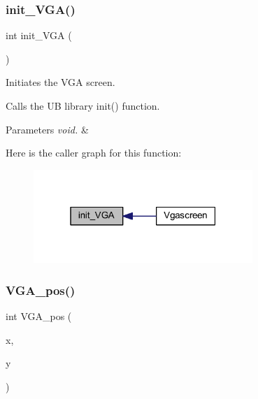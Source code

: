 \subsubsection{\texorpdfstring{init\+\_\+\+V\+G\+A()}{init\_VGA()}}
{\footnotesize\ttfamily int init\+\_\+\+V\+GA (\begin{DoxyParamCaption}\item[{void}]{ }\end{DoxyParamCaption})\hspace{0.3cm}{\ttfamily [private]}}



Initiates the V\+GA screen. 

Calls the UB library init() function.


\begin{DoxyParams}{Parameters}
{\em void.} & \\
\hline
\end{DoxyParams}
Here is the caller graph for this function\+:
\nopagebreak
\begin{figure}[H]
\begin{center}
\leavevmode
\includegraphics[width=235pt]{class_vgascreen_a8240f97328e1e32fdec08a113c927e4f_icgraph}
\end{center}
\end{figure}
\mbox{\label{class_vgascreen_a4e52b131d405cf11ad6aed9b993ed138}} 
\subsubsection{\texorpdfstring{V\+G\+A\+\_\+pos()}{VGA\_pos()}}
{\footnotesize\ttfamily int V\+G\+A\+\_\+pos (\begin{DoxyParamCaption}\item[{int}]{x,  }\item[{int}]{y }\end{DoxyParamCaption})\hspace{0.3cm}{\ttfamily [private]}}



